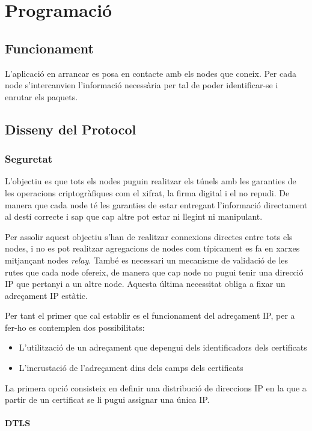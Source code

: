 \chapter{Programació}
\section{Funcionament}
L'aplicació en arrancar es posa en contacte amb els nodes que coneix. Per cada node s'intercanvien l'informació necessària per tal de poder identificar-se i enrutar els paquets.
\section{Disseny del Protocol}
\subsection{Seguretat}
L'objectiu es que tots els nodes puguin realitzar els túnels amb les garanties de les operacions criptogràfiques com el xifrat, la firma digital i el no repudi. De manera que cada node té les garanties de estar entregant l'informació directament al destí correcte i sap que cap altre pot estar ni llegint ni manipulant.

Per assolir aquest objectiu s'han de realitzar connexions directes entre tots els nodes, i no es pot realitzar agregacions de nodes com típicament es fa en xarxes  mitjançant nodes \emph{relay}. També es necessari un mecanisme de validació de les rutes que cada node ofereix, de manera que cap node no pugui tenir una direcció IP que pertanyi a un altre node. Aquesta última necessitat obliga a fixar un adreçament IP estàtic.

Per tant el primer que cal establir es el funcionament del adreçament IP, per a fer-ho es contemplen dos possibilitats:
\begin{itemize}
\item L'utilització de un adreçament que depengui dels identificadors dels certificats
\item L'incrustació de l'adreçament dins dels camps dels certificats
\end{itemize}
La primera opció consisteix en definir una distribució de direccions IP en la que a partir de un certificat se li pugui assignar una única IP.

\subsubsection{DTLS}

